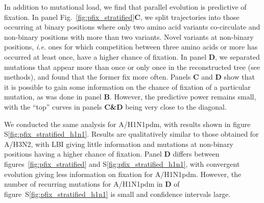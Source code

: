 \documentclass[reprint,amsmath,amssymb,superscriptaddress,showpacs,rmp]{revtex4-1}
\newcommand{\sref}[1]{S\ref{#1}}
\begin{document}
In addition to mutational load, we find that parallel evolution is predictive of fixation.
In panel Fig.~\ref{fig:pfix_stratified}\textbf{C}, we split trajectories into those occurring at binary positions where only two amino acid variants co-circulate and non-binary positions with more than two variants.
Novel variants at non-binary positions, \emph{i.e.} ones for which competition between three amino acids or more has occurred at least once, have a higher chance of fixation.
In panel \textbf{D}, we separated mutations that appear more than once or only once in the reconstructed tree (see methods), and found that the former fix more often.
Panels \textbf{C} and \textbf{D} show that it is possible to gain some information on the chance of fixation of a particular mutation, as was done in panel \textbf{B}.
However, the predictive power remains small, with the ``top'' curves in panels \textbf{C\&D} being very close to the diagonal.

We conducted the same analysis for A/H1N1pdm, with results shown in figure \sref{fig:pfix_stratified_h1n1}.
Results are qualitatively similar to those obtained for A/H3N2, with LBI giving little information and mutations at non-binary positions having a higher chance of fixation.
Panel \textbf{D} differs between figures~\ref{fig:pfix_stratified} and \sref{fig:pfix_stratified_h1n1}, with convergent evolution giving less information on fixation for A/H1N1pdm.
However, the number of recurring mutations for A/H1N1pdm in \textbf{D} of figure~\sref{fig:pfix_stratified_h1n1} is small and confidence intervals large. \\
\end{document}
